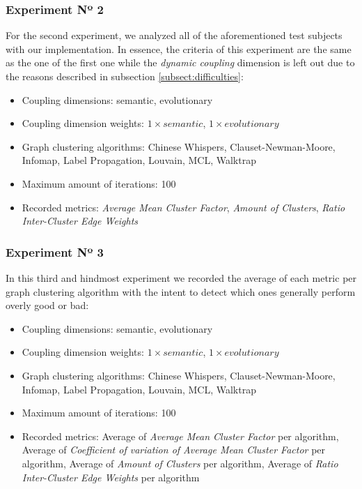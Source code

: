 \documentclass[12pt,a4paper]{report}
\begin{document}
\subsubsection{Experiment Nº 2}
For the second experiment, we analyzed all of the aforementioned test subjects
with our implementation. In essence, the criteria of this experiment are the
same as the one of the first one while the \textit{dynamic coupling} dimension
is left out due to the reasons described in subsection \ref{subsect:difficulties}:
\begin{itemize}[noitemsep]
    \item Coupling dimensions: semantic, evolutionary
    \item Coupling dimension weights: $1 \times semantic$, $1 \times evolutionary$
    \item Graph clustering algorithms: Chinese Whispers, Clauset-Newman-Moore, Infomap, Label Propagation, Louvain, MCL, Walktrap
    \item Maximum amount of iterations: 100
    \item Recorded metrics: \textit{Average Mean Cluster Factor},
    \textit{Amount of Clusters},
    \textit{Ratio Inter-Cluster Edge Weights}
\end{itemize}


\subsubsection{Experiment Nº 3}
In this third and hindmost experiment we recorded the average of each metric per graph
clustering algorithm with the intent to detect which ones generally perform
overly good or bad:
\begin{itemize}[noitemsep]
    \item Coupling dimensions: semantic, evolutionary
    \item Coupling dimension weights: $1 \times semantic$, $1 \times evolutionary$
    \item Graph clustering algorithms: Chinese Whispers, Clauset-Newman-Moore, Infomap, Label Propagation, Louvain, MCL, Walktrap
    \item Maximum amount of iterations: 100
    \item Recorded metrics: Average of \textit{Average Mean Cluster Factor} per algorithm,
    Average of \textit{Coefficient of variation of Average Mean Cluster Factor} per algorithm,
    Average of \textit{Amount of Clusters} per algorithm,
    Average of \textit{Ratio Inter-Cluster Edge Weights} per algorithm
\end{itemize}
\end{document}
